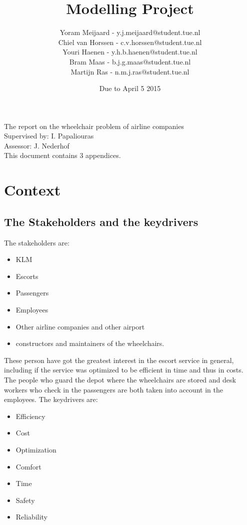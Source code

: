 \documentclass[a4paper, 11pt, notitlepage]{report}
\title{{\Huge Modelling Project} \vspace{290pt}} %
\author{Yoram Meijaard - y.j.meijaard@student.tue.nl\\Chiel van Horssen - c.v.horssen@student.tue.nl\\Youri Haenen - y.h.b.haenen@student.tue.nl\\Bram Maas - b.j.g.maas@student.tue.nl\\Martijn Ras - n.m.j.ras@student.tue.nl} %
\date{Due to April 5 2015} %
\begin{document}
\maketitle
\begin{center}
The report on the wheelchair problem of airline companies %
\\[12pt]
Supervised by: I. Papaliouras \\ Assessor: J. Nederhof %
\\[12pt]
This document contains 3 appendices.
\end{center}
\thispagestyle{empty}
\newpage


\tableofcontents







\setcounter{chapter}{+5}
\chapter{Context}
\section{The Stakeholders and the keydrivers }
The stakeholders are:
\begin{itemize}
 \item KLM
 \item Escorts
 \item Passengers
 \item Employees
 \item Other airline companies and other airport
 \item  constructors and maintainers of the wheelchairs.
\end{itemize}
These person have got the greatest interest in the escort service in general, including if the service was optimized to be efficient in time and thus in costs. The people who guard the depot where the wheelchairs are stored and desk workers who check in the passengers are both taken into account in the employees. The keydrivers are:
\begin{itemize}
	\item Efficiency
	\item Cost
	\item Optimization
	\item Comfort
	\item Time
	\item Safety
	\item Reliability
\end{itemize}
\end{document}
